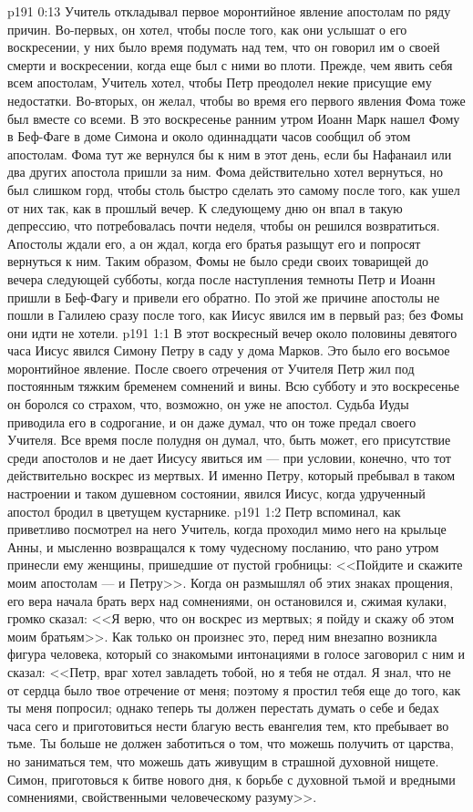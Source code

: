 \vs p191 0:13 Учитель откладывал первое моронтийное явление апостолам по ряду причин. Во\hyp{}первых, он хотел, чтобы после того, как они услышат о его воскресении, у них было время подумать над тем, что он говорил им о своей смерти и воскресении, когда еще был с ними во плоти. Прежде, чем явить себя всем апостолам, Учитель хотел, чтобы Петр преодолел некие присущие ему недостатки. Во\hyp{}вторых, он желал, чтобы во время его первого явления Фома тоже был вместе со всеми. В это воскресенье ранним утром Иоанн Марк нашел Фому в Беф\hyp{}Фаге в доме Симона и около одиннадцати часов сообщил об этом апостолам. Фома тут же вернулся бы к ним в этот день, если бы Нафанаил или два других апостола пришли за ним. Фома действительно хотел вернуться, но был слишком горд, чтобы столь быстро сделать это самому после того, как ушел от них так, как в прошлый вечер. К следующему дню он впал в такую депрессию, что потребовалась почти неделя, чтобы он решился возвратиться. Апостолы ждали его, а он ждал, когда его братья разыщут его и попросят вернуться к ним. Таким образом, Фомы не было среди своих товарищей до вечера следующей субботы, когда после наступления темноты Петр и Иоанн пришли в Беф\hyp{}Фагу и привели его обратно. По этой же причине апостолы не пошли в Галилею сразу после того, как Иисус явился им в первый раз; без Фомы они идти не хотели.
\vs p191 1:1 В этот воскресный вечер около половины девятого часа Иисус явился Симону Петру в саду у дома Марков. Это было его восьмое моронтийное явление. После своего отречения от Учителя Петр жил под постоянным тяжким бременем сомнений и вины. Всю субботу и это воскресенье он боролся со страхом, что, возможно, он уже не апостол. Судьба Иуды приводила его в содрогание, и он даже думал, что он тоже предал своего Учителя. Все время после полудня он думал, что, быть может, его присутствие среди апостолов и не дает Иисусу явиться им --- при условии, конечно, что тот действительно воскрес из мертвых. И именно Петру, который пребывал в таком настроении и таком душевном состоянии, явился Иисус, когда удрученный апостол бродил в цветущем кустарнике.
\vs p191 1:2 Петр вспоминал, как приветливо посмотрел на него Учитель, когда проходил мимо него на крыльце Анны, и мысленно возвращался к тому чудесному посланию, что рано утром принесли ему женщины, пришедшие от пустой гробницы: <<Пойдите и скажите моим апостолам --- и Петру>>. Когда он размышлял об этих знаках прощения, его вера начала брать верх над сомнениями, он остановился и, сжимая кулаки, громко сказал: <<Я верю, что он воскрес из мертвых; я пойду и скажу об этом моим братьям>>. Как только он произнес это, перед ним внезапно возникла фигура человека, который со знакомыми интонациями в голосе заговорил с ним и сказал: <<Петр, враг хотел завладеть тобой, но я тебя не отдал. Я знал, что не от сердца было твое отречение от меня; поэтому я простил тебя еще до того, как ты меня попросил; однако теперь ты должен перестать думать о себе и бедах часа сего и приготовиться нести благую весть евангелия тем, кто пребывает во тьме. Ты больше не должен заботиться о том, что можешь получить от царства, но заниматься тем, что можешь дать живущим в страшной духовной нищете. Симон, приготовься к битве нового дня, к борьбе с духовной тьмой и вредными сомнениями, свойственными человеческому разуму>>.
